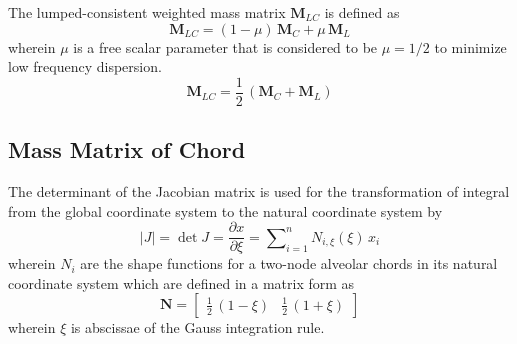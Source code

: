 The lumped-consistent weighted mass matrix $\mathbf{M}_{LC} $ is defined as 
\begin{equation}
\mathbf{M}_{LC}  = (1 - \mu) \, \mathbf{M}_{C} + \mu \, \mathbf{M}_{L}
\end{equation}
wherein $\mu$ is a free scalar parameter that is considered to be $\mu = 1/2$ to minimize low frequency dispersion.
\begin{equation}
\mathbf{M}_{LC}  = \frac{1}{2} \, (\mathbf{M}_{C} + \mathbf{M}_{L})
\label{LumconsMass}
\end{equation}

\subsection{Mass Matrix of Chord}
The determinant of the Jacobian matrix is used for the transformation of integral from the global coordinate system to the natural coordinate system by
\begin{equation}
     |J| = \mathrm{\det} J =  \frac{\partial x }{\partial\xi} = \sum\nolimits_{i=1}^n N_{i,\xi} (\xi) \, x_i
\end{equation}
wherein $N_{i}$ are the shape functions for a two-node alveolar chords in its natural coordinate system which are defined in a matrix form as
\begin{equation}
	\mathbf{N} = \begin{bmatrix}
    \frac{1}{2} \, (1 - \xi) &  \frac{1}{2} \, (1 + \xi)
\end{bmatrix} 
\end{equation}
wherein $\xi$ is abscissae of the Gauss integration rule. 

